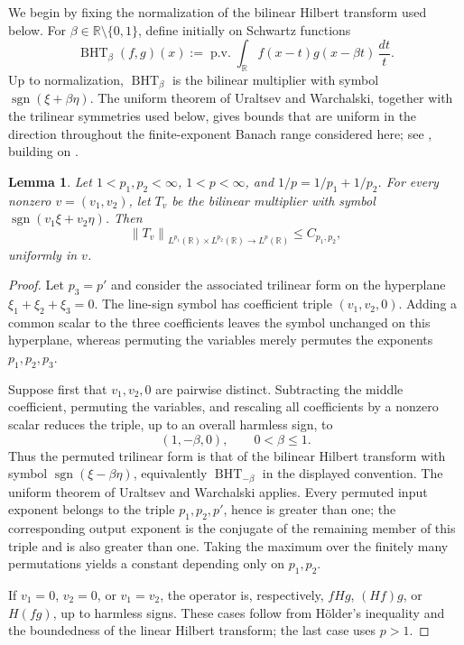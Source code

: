 \documentclass[11pt]{amsart}
\newtheorem{lemma}[definition]{Lemma}
\theoremstyle{remark}
\numberwithin{equation}{section}
\newcommand{\R}{\mathbb R}
\newcommand{\norm}[1]{\left\lVert #1\right\rVert}
\newcommand{\sgn}{\operatorname{sgn}}
\begin{document}
	We begin by fixing the normalization of the bilinear Hilbert transform used
	below.  For
	\(\beta\in\R\setminus\{0,1\}\), define initially on Schwartz functions
	\[
	\operatorname{BHT}_{\beta}(f,g)(x)
	:=
	\operatorname{p.v.}\int_\R
	f(x-t)g(x-\beta t)\,\frac{dt}{t}.
	\]
	Up to normalization, \(\operatorname{BHT}_\beta\) is the bilinear multiplier
	with symbol \(\sgn(\xi+\beta\eta)\).  The uniform theorem of Uraltsev and
	Warchalski, together with the trilinear symmetries used below, gives bounds
	that are uniform in the direction throughout the finite-exponent Banach range
	considered here; see \cite{UraltsevWarchalski2022}, building on
	\cite{LaceyThiele1997,LaceyThiele1999,GrafakosLi2004,Li2006,Thiele2002}.
	
	\begin{lemma}
		\label{lem:line-sign}
		Let \(1<p_1,p_2<\infty\), \(1<p<\infty\), and
		\(1/p=1/p_1+1/p_2\).  For every nonzero \(v=(v_1,v_2)\), let \(T_v\) be the
		bilinear multiplier with symbol \(\sgn(v_1\xi+v_2\eta)\).  Then
		\[
		\norm{T_v}_{L^{p_1}(\R)\times L^{p_2}(\R)\to L^p(\R)}
		\le C_{p_1,p_2},
		\]
		uniformly in \(v\).
	\end{lemma}
	
	\begin{proof}
		Let \(p_3=p'\) and consider the associated trilinear form on the hyperplane
		\(\xi_1+\xi_2+\xi_3=0\).  The line-sign symbol has coefficient triple
		\((v_1,v_2,0)\).  Adding a common scalar to the three coefficients leaves the
		symbol unchanged on this hyperplane, whereas permuting the variables merely
		permutes the exponents \(p_1,p_2,p_3\).
		
		Suppose first that \(v_1,v_2,0\) are pairwise distinct.  Subtracting the middle
		coefficient, permuting the variables, and rescaling all coefficients by a
		nonzero scalar reduces the triple, up to an overall harmless sign, to
		\[
		(1,-\beta,0),
		\qquad 0<\beta\le1.
		\]
		Thus the permuted trilinear form is that of the bilinear Hilbert transform
		with symbol \(\sgn(\xi-\beta\eta)\), equivalently
		\(\operatorname{BHT}_{-\beta}\) in the displayed convention.  The uniform
		theorem of Uraltsev and Warchalski \cite{UraltsevWarchalski2022} applies.  Every
		permuted input exponent belongs to the triple \(p_1,p_2,p'\), hence is greater
		than one; the corresponding output exponent is the conjugate of the remaining
		member of this triple and is also greater than one.  Taking the maximum over
		the finitely many permutations yields a constant depending only on
		\(p_1,p_2\).
		
		If \(v_1=0\), \(v_2=0\), or \(v_1=v_2\), the operator is, respectively,
		\(fHg\), \((Hf)g\), or \(H(fg)\), up to harmless signs.  These cases follow
		from H\"older's inequality and the boundedness of the linear Hilbert transform;
		the last case uses \(p>1\).
	\end{proof}
	
\end{document}
